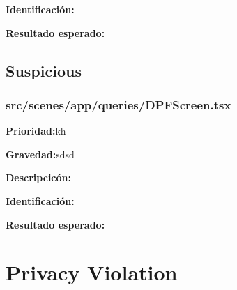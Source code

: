 \documentclass{article}
\begin{document}
        \endgroup

        \begingroup
        \noindent
        \leftskip 35pt 
        \rightskip 0pt 
        \vspace{10pt}
        \textbf{Identificación:}
        
        \endgroup

        \begingroup
        \noindent
        \leftskip 35pt 
        \rightskip 0pt 
        \vspace{10pt}
        \textbf{Resultado esperado:}
    
        \endgroup
    \subsection{Suspicious}
        \subsubsection{src/scenes/app/queries/DPFScreen.tsx}
        \begingroup
        \noindent
        \leftskip 35pt 
        \rightskip 0pt 
        \vspace{10pt}
        \textbf{Prioridad:}kh

        \endgroup

        \begingroup
        \noindent
        \leftskip 35pt 
        \rightskip 0pt 
        \vspace{10pt}
        \textbf{Gravedad:}sdsd

        \endgroup
            
        \begingroup
        \noindent
        \leftskip 35pt 
        \rightskip 0pt 
        \vspace{10pt}
        \textbf{Descripcicón:}
    
        \endgroup

        \begingroup
        \noindent
        \leftskip 35pt 
        \rightskip 0pt 
        \vspace{10pt}
        \textbf{Identificación:}
        
        \endgroup

        \begingroup
        \noindent
        \leftskip 35pt 
        \rightskip 0pt 
        \vspace{10pt}
        \textbf{Resultado esperado:}
    
        \endgroup
   

\section{Privacy Violation}
\end{document}
